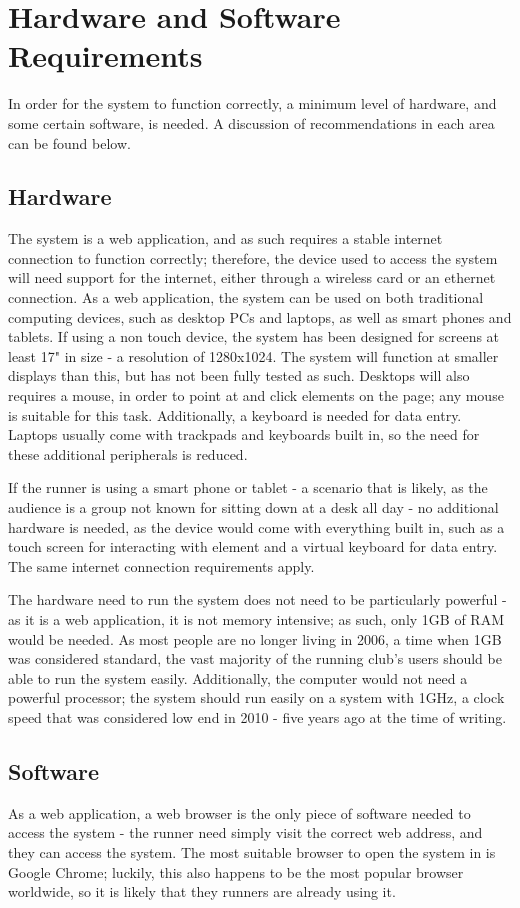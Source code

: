 \documentclass{article}[12pt,a4paper]
\begin{document}
\section{Hardware and Software Requirements}
In order for the system to function correctly, a minimum level of hardware, and some certain software, is needed. A discussion of recommendations in each area can be found below.

\subsection{Hardware}
The system is a web application, and as such requires a stable internet connection to function correctly; therefore, the device used to access the system will need support for the internet, either through a wireless card or an ethernet connection. As a web application, the system can be used on both traditional computing devices, such as desktop PCs and laptops, as well as smart phones and tablets. If using a non touch device, the system has been designed for screens at least 17" in size - a resolution of 1280x1024. The system will function at smaller displays than this, but has not been fully tested as such. Desktops will also requires a mouse, in order to point at and click elements on the page; any mouse is suitable for this task. Additionally, a keyboard is needed for data entry. Laptops usually come with trackpads and keyboards built in, so the need for these additional peripherals is reduced.

If the runner is using a smart phone or tablet - a scenario that is likely, as the audience is a group not known for sitting down at a desk all day - no additional hardware is needed, as the device would come with everything built in, such as a touch screen for interacting with element and a virtual keyboard for data entry. The same internet connection requirements apply.

The hardware need to run the system does not need to be particularly powerful - as it is a web application, it is not memory intensive; as such, only 1GB of RAM would be needed. As most people are no longer living in 2006, a time when 1GB was considered standard, the vast majority of the running club's users should be able to run the system easily. Additionally, the computer would not need a powerful processor; the system should run easily on a system with 1GHz, a clock speed that was considered low end in 2010 - five years ago at the time of writing. 

\subsection{Software}
As a web application, a web browser is the only piece of software needed to access the system - the runner need simply visit the correct web address, and they can access the system. The most suitable browser to open the system in is Google Chrome; luckily, this also happens to be the most popular browser worldwide, so it is likely that they runners are already using it.
\end{document}
